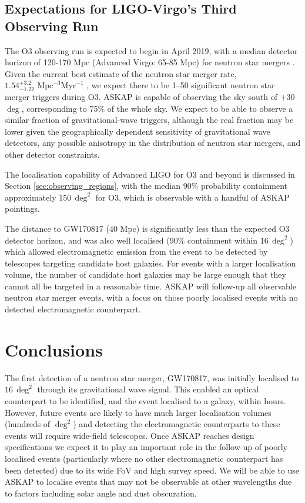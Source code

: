 \subsection{Expectations for LIGO-Virgo's Third Observing Run}
The O3 observing run is expected to begin in April 2019, with a median detector horizon of 120-170 Mpc (Advanced Virgo: 65-85 Mpc) for neutron star mergers \citep{2018LRR....21....3A}. Given the current best estimate of the neutron star merger rate, $1.54^{+3.2}_{-1.22}\textrm{ Mpc}^{-3}\textrm{Myr}^{-1}$ \citep{2017PhRvL.119p1101A}, we expect there to be 1--50 significant neutron star merger triggers during O3. ASKAP is capable of observing the sky south of $+30$\,$\deg$, corresponding to 75\% of the whole sky. We expect to be able to observe a similar fraction of gravitational-wave triggers, although the real fraction may be lower given the geographically dependent sensitivity of gravitational wave detectors, any possible anisotropy in the distribution of neutron star mergers, and other detector constraints.

The localisation capability of Advanced LIGO for O3 and beyond is discussed in Section \ref{sec:observing_regions}, with the median 90\% probability containment approximately 150\,$\deg^2$ for O3, which is observable with a handful of ASKAP pointings.

The distance to GW170817 (40 Mpc) is significantly less than the expected O3 detector horizon, and was also well localised (90\% containment within $16\,\deg^{2}$) which allowed electromagnetic emission from the event to be detected by telescopes targeting candidate host galaxies. For events with a larger localisation volume, the number of candidate host galaxies may be large enough that they cannot all be targeted in a reasonable time. ASKAP will follow-up all observable neutron star merger events, with a focus on those poorly localised events with no detected electromagnetic counterpart.

\pagebreak
\section{Conclusions}
The first detection of a neutron star merger, GW170817, was initially localised to $16\,\deg^{2}$ through its gravitational wave signal. This enabled an optical counterpart to be identified, and the event localised to a galaxy, within hours. However, future events are likely to have much larger localisation volumes (hundreds of $\deg^{2}$) and detecting the electromagnetic counterparts to these events will require wide-field telescopes. Once ASKAP reaches design specifications we expect it to play an important role in the follow-up of poorly localised events (particularly where no other electromagnetic counterpart has been detected) due to its wide FoV and high survey speed. We will be able to use ASKAP to localise events that may not be observable at other wavelengths due to factors including solar angle and dust obscuration.

